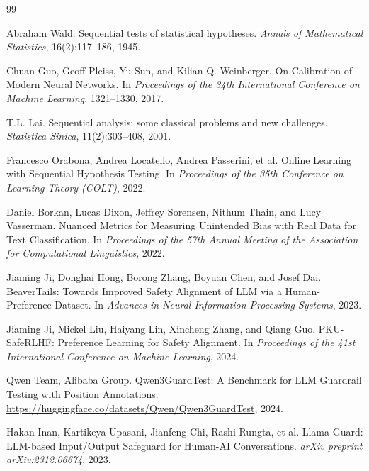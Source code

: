 \documentclass[acmtjournal, acmnowidth]{acmart}
\theoremstyle{definition}
\begin{document}


\begin{thebibliography}{99}

Abraham Wald.
\newblock Sequential tests of statistical hypotheses.
\newblock \emph{Annals of Mathematical Statistics}, 16(2):117--186, 1945.

Chuan Guo, Geoff Pleiss, Yu Sun, and Kilian Q. Weinberger.
\newblock On Calibration of Modern Neural Networks.
\newblock In \emph{Proceedings of the 34th International Conference on Machine Learning}, 1321--1330, 2017.

T.L. Lai.
\newblock Sequential analysis: some classical problems and new challenges.
\newblock \emph{Statistica Sinica}, 11(2):303--408, 2001.

Francesco Orabona, Andrea Locatello, Andrea Passerini, et al.
\newblock Online Learning with Sequential Hypothesis Testing.
\newblock In \emph{Proceedings of the 35th Conference on Learning Theory (COLT)}, 2022.

Daniel Borkan, Lucas Dixon, Jeffrey Sorensen, Nithum Thain, and Lucy Vasserman.
\newblock Nuanced Metrics for Measuring Unintended Bias with Real Data for Text Classification.
\newblock In \emph{Proceedings of the 57th Annual Meeting of the Association for Computational Linguistics}, 2022.

Jiaming Ji, Donghai Hong, Borong Zhang, Boyuan Chen, and Josef Dai.
\newblock BeaverTails: Towards Improved Safety Alignment of LLM via a Human-Preference Dataset.
\newblock In \emph{Advances in Neural Information Processing Systems}, 2023.

Jiaming Ji, Mickel Liu, Haiyang Lin, Xincheng Zhang, and Qiang Guo.
\newblock PKU-SafeRLHF: Preference Learning for Safety Alignment.
\newblock In \emph{Proceedings of the 41st International Conference on Machine Learning}, 2024.

Qwen Team, Alibaba Group.
\newblock Qwen3GuardTest: A Benchmark for LLM Guardrail Testing with Position Annotations.
\newblock \url{https://huggingface.co/datasets/Qwen/Qwen3GuardTest}, 2024.

Hakan Inan, Kartikeya Upasani, Jianfeng Chi, Rashi Rungta, et al.
\newblock Llama Guard: LLM-based Input/Output Safeguard for Human-AI Conversations.
\newblock \emph{arXiv preprint arXiv:2312.06674}, 2023.


\end{thebibliography}
\end{document}
